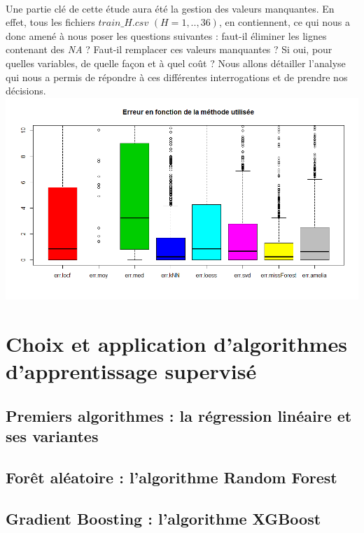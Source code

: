 \documentclass[14pt, openany]{article}
\begin{document}
\paragraph{}
Une partie clé de cette étude aura été la gestion des valeurs manquantes. En effet, tous les fichiers $train\_H.csv$ $(H=1,..,36)$, en contiennent, ce qui nous a donc amené à nous poser les questions suivantes : faut-il éliminer les lignes contenant des \textit{NA} ? Faut-il remplacer ces valeurs manquantes ? Si oui, pour quelles variables, de quelle façon et à quel coût ? Nous allons détailler l'analyse qui nous a permis de répondre à ces différentes interrogations et de prendre nos décisions.
\includegraphics[width=17cm]{Images/err_imp.png}
\begin{center}
\label{fig1}
\end{center}

\section{Choix et application d'algorithmes d'apprentissage supervisé}

\subsection{Premiers algorithmes : la régression linéaire et ses variantes}

\subsection{Forêt aléatoire : l'algorithme Random Forest}

\subsection{Gradient Boosting : l'algorithme XGBoost}
\end{document}
